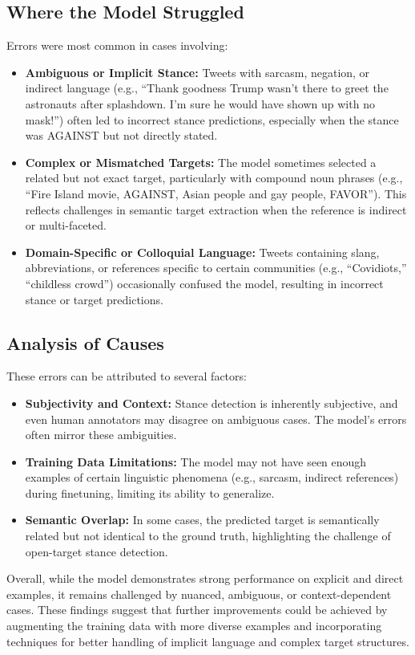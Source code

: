 \documentclass[twocolumn,11pt,letterpaper]{article}
\begin{document}
\subsection*{Where the Model Struggled}
Errors were most common in cases involving:
\begin{itemize}
    \item \textbf{Ambiguous or Implicit Stance:} Tweets with sarcasm, negation, or indirect language (e.g., ``Thank goodness Trump wasn't there to greet the astronauts after splashdown. I'm sure he would have shown up with no mask!'') often led to incorrect stance predictions, especially when the stance was AGAINST but not directly stated.
    \item \textbf{Complex or Mismatched Targets:} The model sometimes selected a related but not exact target, particularly with compound noun phrases (e.g., ``Fire Island movie, AGAINST, Asian people and gay people, FAVOR''). This reflects challenges in semantic target extraction when the reference is indirect or multi-faceted.
    \item \textbf{Domain-Specific or Colloquial Language:} Tweets containing slang, abbreviations, or references specific to certain communities (e.g., ``Covidiots,'' ``childless crowd'') occasionally confused the model, resulting in incorrect stance or target predictions.
\end{itemize}

\subsection*{Analysis of Causes}
These errors can be attributed to several factors:
\begin{itemize}
    \item \textbf{Subjectivity and Context:} Stance detection is inherently subjective, and even human annotators may disagree on ambiguous cases. The model's errors often mirror these ambiguities.
    \item \textbf{Training Data Limitations:} The model may not have seen enough examples of certain linguistic phenomena (e.g., sarcasm, indirect references) during finetuning, limiting its ability to generalize.
    \item \textbf{Semantic Overlap:} In some cases, the predicted target is semantically related but not identical to the ground truth, highlighting the challenge of open-target stance detection.
\end{itemize}

Overall, while the model demonstrates strong performance on explicit and direct examples, it remains challenged by nuanced, ambiguous, or context-dependent cases. These findings suggest that further improvements could be achieved by augmenting the training data with more diverse examples and incorporating techniques for better handling of implicit language and complex target structures.
\end{document}
